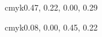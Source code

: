 %
%


\definecolor{cPython}   {cmyk}{0.47, 0.22, 0.00, 0.29}

\definecolor{cWerkzeug} {cmyk}{0.08, 0.00, 0.45, 0.22}
